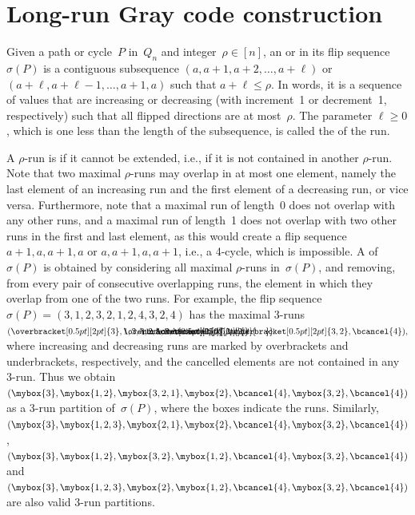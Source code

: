 \documentclass[a4paper,11pt,reqno]{amsart}
\begin{document}
\section{Long-run Gray code construction}
\label{sec:run}

Given a path or cycle~$P$ in~$Q_n$ and integer~$\rho\in[n]$, an  or  in its flip sequence~$\sigma(P)$ is a contiguous subsequence $(a,a+1,a+2,\ldots,a+\ell)$ or $(a+\ell,a+\ell-1,\ldots,a+1,a)$ such that $a+\ell\leq \rho$.
In words, it is a sequence of values that are increasing or decreasing (with increment~1 or decrement~1, respectively) such that all flipped directions are at most~$\rho$.
The parameter $\ell\geq 0$, which is one less than the length of the subsequence, is called the  of the run.

A $\rho$-run is  if it cannot be extended, i.e., if it is not contained in another $\rho$-run.
Note that two maximal $\rho$-runs may overlap in at most one element, namely the last element of an increasing run and the first element of a decreasing run, or vice versa.
Furthermore, note that a maximal run of length~0 does not overlap with any other runs, and a maximal run of length~1 does not overlap with two other runs in the first and last element, as this would create a flip sequence $a+1,a,a+1,a$ or $a,a+1,a,a+1$, i.e., a 4-cycle, which is impossible.
A  of~$\sigma(P)$ is obtained by considering all maximal $\rho$-runs in~$\sigma(P)$, and removing, from every pair of consecutive overlapping runs, the element in which they overlap from one of the two runs.
For example, the flip sequence $\sigma(P)=(3,1,2,3,2,1,2,4,3,2,4)$ has the maximal 3-runs
$
(\overbracket[0.5pt][2pt]{3},\lefteqn{\overbracket[0.5pt][2pt]{\phantom{1,2,3}}}1,2,\lefteqn{\underbracket[0.5pt][2pt]{\phantom{3,2,1}}}3,2,\lefteqn{\overbracket[0.5pt][2pt]{\phantom{1,2}}}1,2,\bcancel{4},\underbracket[0.5pt][2pt]{3,2},\bcancel{4}),
$
where increasing and decreasing runs are marked by overbrackets and underbrackets, respectively, and the cancelled elements are not contained in any 3-run.
Thus we obtain $(\mybox{3},\mybox{1,2},\mybox{3,2,1},\mybox{2},\bcancel{4},\mybox{3,2},\bcancel{4})$ as a 3-run partition of~$\sigma(P)$, where the boxes indicate the runs.
Similarly, $(\mybox{3},\mybox{1,2,3},\mybox{2,1},\mybox{2},\bcancel{4},\mybox{3,2},\bcancel{4})$, $(\mybox{3},\mybox{1,2},\mybox{3,2},\mybox{1,2},\bcancel{4},\mybox{3,2},\bcancel{4})$ and $(\mybox{3},\mybox{1,2,3},\mybox{2},\mybox{1,2},\bcancel{4},\mybox{3,2},\bcancel{4})$ are also valid 3-run partitions.
\end{document}
